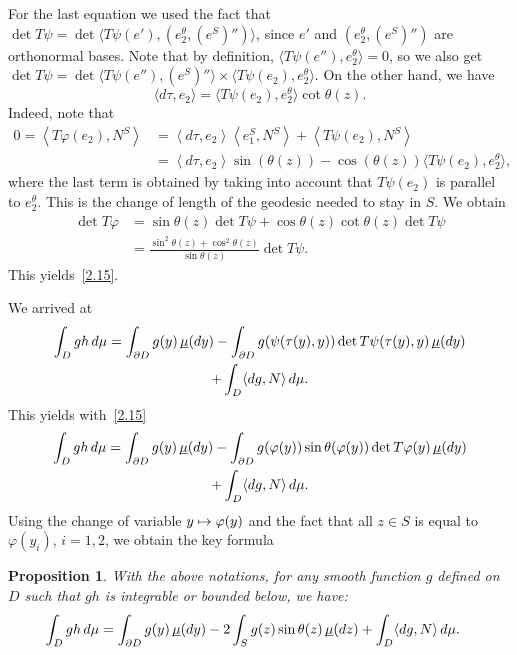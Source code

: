\documentclass[JEP,XML,SOM,Unicode,NoFloatCountersInSection,published]{cedram}
\newcommand\mto{\mathchoice{\longmapsto}{\mapsto}{\mapsto}{\mapsto}}
\theoremstyle{plain}
\newtheorem{prop}[thm]{Proposition}
\theoremstyle{definition}
\newcommand{\lan}{\lt\langle}
\newcommand{\ran}{\rt\rangle}
\newcommand{\lt}{\left}
\newcommand{\rt}{\right}
\newcommand{\usm}{{\underline{\smash{\mu}}}}
\let\f\frac
\begin{document}
For the last equation we used the fact that $\det T\psi= \det \langle T\psi(e'), (e_2^\theta, (e^S)'')\rangle$, {since $e'$ and $(e_2^\theta, (e^S)'')$
are orthonormal bases. Note that by definition, $\langle T\psi(e''),e_2^\theta\rangle=0$,
so we also get $\det T\psi=\det \langle T\psi(e''), (e^S)''\rangle\times \langle T\psi(e_2), e_2^\theta\rangle$.}
On the other hand, we have
\begin{equation}
\langle d\tau,e_2\rangle =\langle T\psi (e_2), e_2^\theta\rangle \cot\theta{(z)}.
\end{equation}
{Indeed, note that
\begin{align*}
0=\lan T\varphi(e_2), N^S\ran
&=\lan d\tau, e_2\ran \lan e_1^S, N^S\ran+\lan T\psi(e_2), N^S\ran\\
&=\lan d\tau, e_2\ran \sin(\theta(z))-\cos(\theta(z))\bigl\langle T\psi(e_2), e_2^\theta\bigr\rangle,
\end{align*}
where the last term is obtained by taking into account that $ T\psi(e_2)$ is parallel to $e_2^\theta$.}
This is the change of length of the geodesic needed to stay in $S$.
We obtain
\begin{align*}
\det T\varphi&=\sin\theta(z)\det T\psi +\cos\theta(z)\cot\theta(z)\det T\psi\\
&=\f{\sin^2\theta(z)+\cos^2\theta(z)}{\sin\theta(z)}\det T\psi.
\end{align*}
This yields~\eqref{2.15}.

We arrived at
\begin{multline}
\int_Dgh\,d\mu=\int_{\partial D}g(y)\,\usm(dy)-\int_{\partial D}g(\psi(\tau(y),y))\det T\psi(\tau(y),y)\,\usm(dy)\\
+\int_D\langle dg,N\rangle \, d\mu.
\end{multline}
This yields with~\eqref{2.15}
\begin{multline}
\int_Dgh\,d\mu=\int_{\partial D}g(y)\,\usm(dy)-\int_{\partial D}g(\varphi(y))\sin\theta(\varphi(y))\det T\varphi(y)\,\usm(dy)\\
+\int_D\langle dg,N\rangle \, d\mu.
\end{multline}
Using the change of variable $y\mto\varphi(y)$ and the fact that all $z\in S$ is equal to $\varphi(y_i)$, $i=1,2$, we obtain the key formula
\begin{prop}
\label{P1}
{With the above notations, for any smooth function $g$ defined on~$D$ {such that $gh$ is integrable or bounded below}, we have:}
\begin{equation}
\begin{split}
\int_Dgh\,d\mu&=\int_{\partial D}g(y)\,\usm(dy)-2\int_{S}g(z)\sin\theta(z)\,\usm(dz)+\int_D\langle dg,N\rangle \, d\mu.
\end{split}
\end{equation}
\end{prop}
\end{document}

